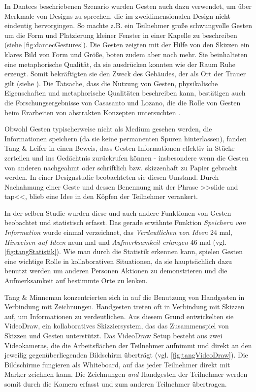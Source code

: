 \medskip In Dantecs beschriebenen Szenario wurden Gesten auch dazu verwendet, um über Merkmale von Designs zu sprechen, die im zweidimensionalen Design nicht eindeutig hervorgingen. So machte z.B. ein Teilnehmer große schwungvolle Gesten um die Form und Platzierung kleiner Fenster in einer Kapelle zu beschreiben (siehe \autoref{fig:dantecGestures}). Die Gesten zeigten mit der Hilfe von den Skizzen ein klares Bild von Form und Größe, boten zudem aber noch mehr. Sie beinhalteten eine metaphorische Qualität, da sie ausdrücken konnten wie der Raum Ruhe erzeugt. Somit bekräftigten sie den Zweck des Gebäudes, der als Ort der Trauer gilt (siehe ). Die Tatsache, dass die Nutzung von Gesten, physikalische Eigenschaften und metaphorische Qualitäten beschreiben kann, bestätigen auch die Forschungsergebnisse von Casasanto und Lozano, die die Rolle von Gesten beim Erarbeiten von abstrakten Konzepten untersuchten \citep{Casasanto:2006}.

\medskip Obwohl Gesten typischerweise nicht als Medium gesehen werden, die Informationen speichern (da sie keine permanenten Spuren hinterlassen), fanden Tang \& Leifer in \citep{Tang:1988p279} einen Beweis, dass Gesten Informationen effektiv in Stücke zerteilen und ins Gedächtnis zurückrufen können - insbesondere wenn die Gesten von anderen nachgeahmt oder schriftlich bzw. skizzenhaft zu Papier gebracht werden. In einer Designstudie beobachteten sie diesen Umstand. Durch Nachahmung einer Geste und dessen Benennung mit der Phrase >>slide and tap<<, blieb eine Idee in den Köpfen der Teilnehmer verankert.

\medskip In der selben Studie wurden diese und auch andere Funktionen von Gesten beobachtet und statistisch erfasst. Das gerade erwähnte Funktion \emph{Speichern von Information} wurde einmal verzeichnet, das \emph{Verdeutlichen von Ideen} 24 mal, \emph{Hinweisen auf Ideen} neun mal und \emph{Aufmerksamkeit erlangen} 46 mal (vgl. \autoref{fig:tangStatistik}). Wie man durch die Statistik erkennen kann, spielen Gesten eine wichtige Rolle in kollaborativen Situationen, da sie hauptsächlich dazu benutzt werden um anderen Personen Aktionen zu demonstrieren und die Aufmerksamkeit auf bestimmte Orte zu lenken.

\medskip Tang \& Minneman konzentrierten sich in \citep{Tang:1991p28} auf die Benutzung von Handgesten in Verbindung mit Zeichnungen. Handgesten treten oft in Verbindung mit Skizzen auf, um Informationen zu verdeutlichen. Aus diesem Grund entwickelten sie VideoDraw, ein kollaboratives Skizziersystem, das das Zusammenspiel von Skizzen und Gesten unterstützt. Das VideoDraw Setup besteht aus zwei Videokameras, die die Arbeitsflächen der Teilnehmer aufnimmt und direkt an den jeweilig gegenüberliegenden Bildschirm überträgt (vgl. \autoref{fig:tangVideoDraw}). Die Bildschirme fungieren als Whiteboard, auf das jeder Teilnehmer direkt mit Marker zeichnen kann. Die Zeichnungen \emph{und} Handgesten der Teilnehmer werden somit durch die Kamera erfasst und zum anderen Teilnehmer übertragen.

